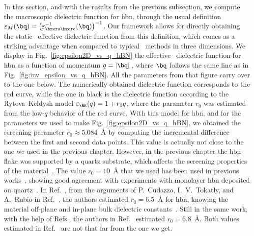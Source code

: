 In this section, and with the results from the previous subsection, we compute the macroscopic dielectric function for \gls{hbn}, through the usual definition $\varepsilon_M (\bq) = \big(\varepsilon^{-1}_{\bzero \bzero} (\bq)\big)^{-1}$.
Our framework allows for directly obtaining the static \bd~effective dielectric function from this definition, which comes as a striking advantage when compared to typical \abinit~methods in three dimensions.
We display in Fig.~\ref{fig:epsilon2D_vs_q_hBN} the effective \bd~dielectric function for \gls{hbn} as a function of momentum $q=|\bq|$\,, where $\bq$ follows the same line as in Fig.~\ref{fig:inv_epsilon_vs_q_hBN}.
All the parameters from that figure carry over to the one below.
The numerically obtained dielectric function corresponds to the red curve, while the one in black is the dielectric function according to the Rytova--Keldysh model $\varepsilon_{\RK} (q) = 1 + r_0 q$, where the parameter $r_0$ was estimated from the low-$q$ behavior of the red curve.
With this model for \gls{hbn}, and for the parameters we used to make Fig.~\ref{fig:epsilon2D_vs_q_hBN}, we obtained the screening parameter $r_0 \approx 5.084$~\unit{\angstrom} by computing the incremental difference between the first and second data points.
This value is actually not close to the one we used in the previous chapter.
However, in the previous chapter the \gls{hbn} flake was supported by a quartz substrate, which affects the screening properties of the material~\cite{Trolle_Pedersen_Veniard_2017}.
The value $r_0 = 10$~\unit{\angstrom} that we used has been used in previous works~\cite{Ferreira_2019,Ventura_2019}, showing good agreement with experiments with monolayer \gls{hbn} deposited on quartz~\cite{Cassabois_2019}.
In Ref.~\cite{Ventura_2019}, from the arguments of P.~Cudazzo, I.~V.~Tokatly, and A.~Rubio in Ref.~\cite{Cudazzo_2011}, the authors estimated $r_0 = 6.5$~\unit{\angstrom} for \gls{hbn}, knowing the material off-plane and in-plane bulk dielectric constants~\cite{Laturia_2018}.
Still in the same work, with the help of Refs.\cite{Trolle_Pedersen_Veniard_2017,Latini_2015}, the authors in Ref.~\cite{Ventura_2019} estimated $r_0 = 6.8$~\unit{\angstrom}.
Both values estimated in Ref.~\cite{Ventura_2019} are not that far from the one we get.

